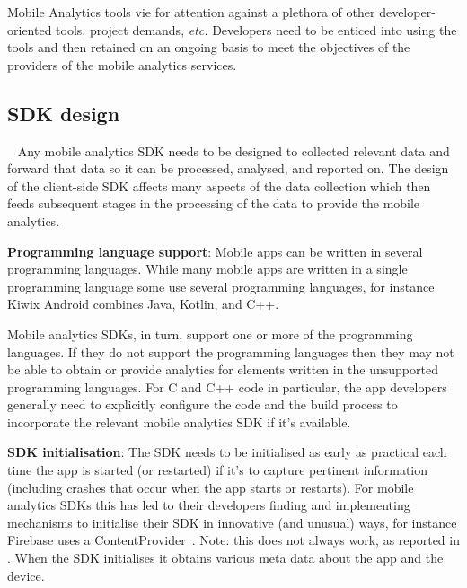 Mobile Analytics tools vie for attention against a plethora of other developer-oriented tools, project demands, \emph{etc.} Developers need to be enticed into using the tools and then retained on an ongoing basis to meet the objectives of the providers of the mobile analytics services.

\subsection{SDK design}~\label{section-sdk-design}
Any mobile analytics SDK needs to be designed to collected relevant data and forward that data so it can be processed, analysed, and reported on. The design of the client-side SDK affects many aspects of the data collection which then feeds subsequent stages in the processing of the data to provide the mobile analytics.

\textbf{Programming language support}: 
Mobile apps %
can be written in several programming languages. While many mobile apps are written in a single programming language some use several programming languages, for instance Kiwix Android combines Java, Kotlin, and C++. 

Mobile analytics SDKs, in turn, support one or more of the programming languages. If they do not support the programming languages then they may not be able to obtain or provide analytics for elements written in the unsupported programming languages. For C and C++ code in particular, the app developers generally need to explicitly configure the code and the build process to incorporate the relevant mobile analytics SDK if it's available. %

\textbf{SDK initialisation}: 
The SDK needs to be initialised as early as practical each time the app is started (or restarted) if it's to capture pertinent information (including crashes that occur when the app starts or restarts). For mobile analytics SDKs this has led to their developers finding and implementing mechanisms to initialise their SDK in innovative (and unusual) ways, for instance Firebase uses a ContentProvider~\citep{stevenson2016_how_does_firebase_initialize_on_android}. Note: this does not always work, as reported in \citep{reddy2022_crashlytics_fails_to_track_app_startup_crashes}. When the SDK initialises it obtains various meta data about the app and the device. 

